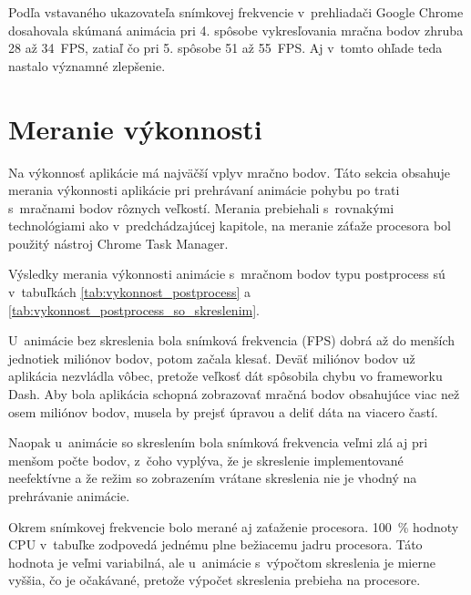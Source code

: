 Podľa vstavaného ukazovateľa snímkovej frekvencie v~prehliadači Google Chrome dosahovala skúmaná animácia pri 4. spôsobe vykresľovania mračna bodov zhruba 28 až 34~FPS, zatiaľ čo pri 5. spôsobe 51 až 55~FPS. Aj v~tomto ohľade teda nastalo významné zlepšenie.

\section{Meranie výkonnosti}

Na výkonnosť aplikácie má najväčší vplyv mračno bodov. Táto sekcia obsahuje merania výkonnosti aplikácie pri prehrávaní animácie pohybu po trati s~mračnami bodov rôznych veľkostí. Merania prebiehali s~rovnakými technológiami ako v~predchádzajúcej kapitole, na meranie záťaže procesora bol použitý nástroj Chrome Task Manager.

Výsledky merania výkonnosti animácie s~mračnom bodov typu postprocess sú v~tabuľkách \ref{tab:vykonnost_postprocess} a \ref{tab:vykonnost_postprocess_so_skreslenim}. 

U~animácie bez skreslenia bola snímková frekvencia (FPS) dobrá až do menších jednotiek miliónov bodov, potom začala klesať. Deväť miliónov bodov už aplikácia nezvládla vôbec, pretože veľkosť dát spôsobila chybu vo frameworku Dash. Aby bola aplikácia schopná zobrazovať mračná bodov obsahujúce viac než osem miliónov bodov, musela by prejsť úpravou a deliť dáta na viacero častí. 

Naopak u~animácie so skreslením bola snímková frekvencia veľmi zlá aj pri menšom počte bodov, z~čoho vyplýva, že je skreslenie implementované neefektívne a že režim so zobrazením vrátane skreslenia nie je vhodný na prehrávanie animácie.

Okrem snímkovej frekvencie bolo merané aj zaťaženie procesora. 100~\% hodnoty CPU v~tabuľke zodpovedá jednému plne bežiacemu jadru procesora. Táto hodnota je veľmi variabilná, ale u~animácie s~výpočtom skreslenia je mierne vyššia, čo je očakávané, pretože výpočet skreslenia prebieha na procesore.

